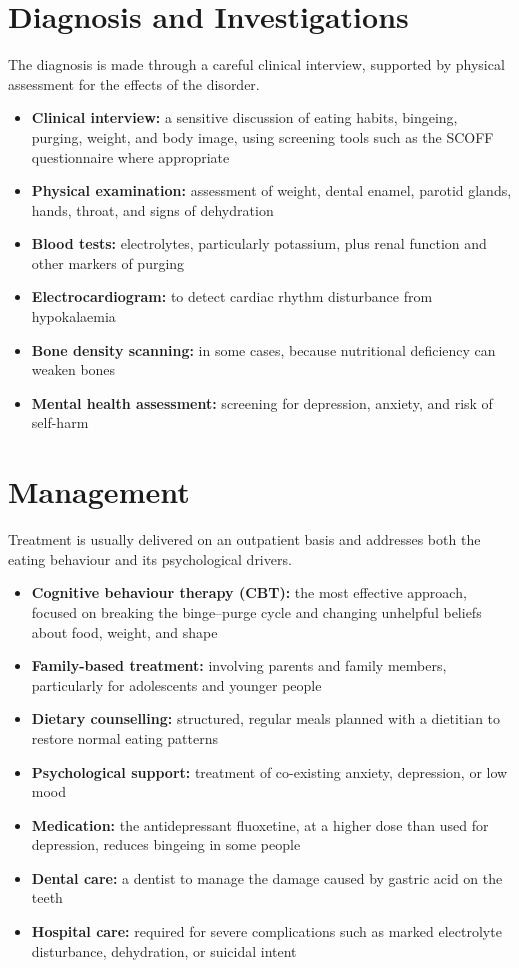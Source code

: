\section*{Diagnosis and Investigations}
The diagnosis is made through a careful clinical interview, supported by physical assessment for the effects of the disorder.

\begin{itemize}
    \item \textbf{Clinical interview:} a sensitive discussion of eating habits, bingeing, purging, weight, and body image, using screening tools such as the SCOFF questionnaire where appropriate
    \item \textbf{Physical examination:} assessment of weight, dental enamel, parotid glands, hands, throat, and signs of dehydration
    \item \textbf{Blood tests:} electrolytes, particularly potassium, plus renal function and other markers of purging
    \item \textbf{Electrocardiogram:} to detect cardiac rhythm disturbance from hypokalaemia
    \item \textbf{Bone density scanning:} in some cases, because nutritional deficiency can weaken bones
    \item \textbf{Mental health assessment:} screening for depression, anxiety, and risk of self-harm
\end{itemize}

\section*{Management}
Treatment is usually delivered on an outpatient basis and addresses both the eating behaviour and its psychological drivers.

\begin{itemize}
    \item \textbf{Cognitive behaviour therapy (CBT):} the most effective approach, focused on breaking the binge--purge cycle and changing unhelpful beliefs about food, weight, and shape
    \item \textbf{Family-based treatment:} involving parents and family members, particularly for adolescents and younger people
    \item \textbf{Dietary counselling:} structured, regular meals planned with a dietitian to restore normal eating patterns
    \item \textbf{Psychological support:} treatment of co-existing anxiety, depression, or low mood
    \item \textbf{Medication:} the antidepressant fluoxetine, at a higher dose than used for depression, reduces bingeing in some people
    \item \textbf{Dental care:} a dentist to manage the damage caused by gastric acid on the teeth
    \item \textbf{Hospital care:} required for severe complications such as marked electrolyte disturbance, dehydration, or suicidal intent
\end{itemize}

